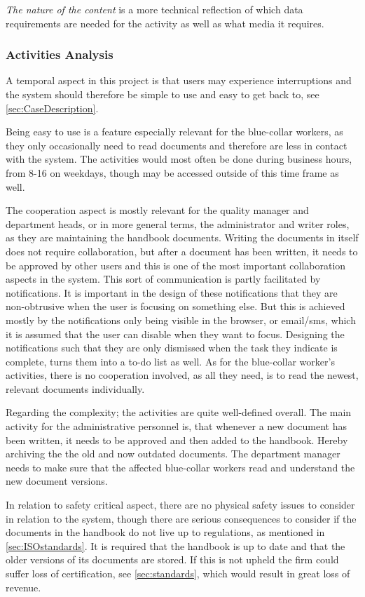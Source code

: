 \textit{The nature of the content} is a more technical reflection of which data requirements are needed for the activity as well as what media it requires.

\subsubsection*{Activities Analysis}
A temporal aspect in this project is that users may experience interruptions and the system should therefore be simple to use and easy to get back to, see \cref{sec:CaseDescription}.

Being easy to use is a feature especially relevant for the blue-collar workers, as they only occasionally need to read documents and therefore are less in contact with the system.
The activities would most often be done during business hours, from 8-16 on weekdays, though may be accessed outside of this time frame as well.

The cooperation aspect is mostly relevant for the  quality manager and department heads, or in more general terms, the administrator and writer roles, as they are maintaining the handbook documents.
Writing the documents in itself does not require collaboration, but after a document has been written, it needs to be approved by other users and this is one of the most important collaboration aspects in the system.
This sort of communication is partly facilitated by notifications.
It is important in the design of these notifications that they are non-obtrusive when the user is focusing on something else.
But this is achieved mostly by the notifications only being visible in the browser, or email/sms, which it is assumed that the user can disable when they want to focus.
Designing the notifications such that they are only dismissed when the task they indicate is complete, turns them into a to-do list as well.
As for the blue-collar worker's activities, there is no cooperation involved, as all they need, is to read the newest, relevant documents individually.

Regarding the complexity; the activities are quite well-defined overall.
The main activity for the administrative personnel is, that whenever a new document has been written, it needs to be approved and then added to the handbook.
Hereby archiving the the old and now outdated documents.
The department manager needs to make sure that the affected blue-collar workers read and understand the new document versions.

In relation to safety critical aspect, there are no physical safety issues to consider in relation to the system, though there are serious consequences to consider if the documents in the handbook do not live up to regulations, as mentioned in \cref{sec:ISOstandards}.
It is required that the handbook is up to date and that the older versions of its documents are stored.
If this is not upheld the firm could suffer loss of certification, see \cref{sec:standards}, which would result in great loss of revenue.

